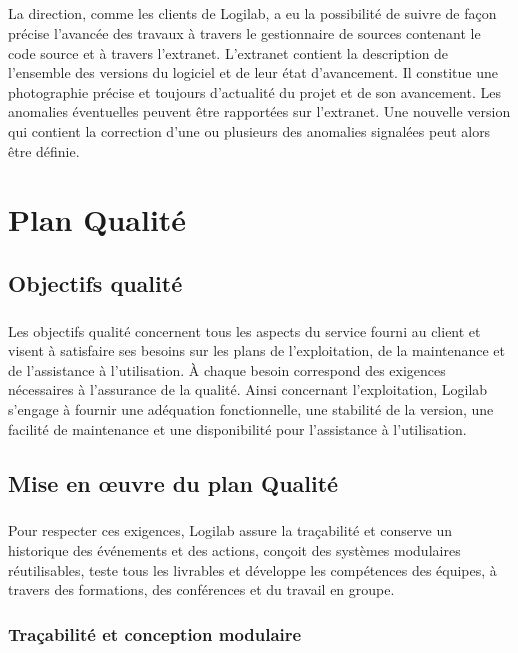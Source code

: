 \documentclass {report}
\begin{document}
\paragraph{}
La direction, comme les clients de Logilab, a eu la possibilité de suivre de façon précise l’avancée des travaux à travers le gestionnaire de sources contenant le code source et à travers l’extranet. L’extranet contient la description de l’ensemble des versions du logiciel et de leur état d’avancement. Il constitue une photographie précise et toujours d’actualité du projet et de son avancement. Les anomalies éventuelles peuvent être rapportées sur l’extranet. Une nouvelle version qui contient la correction d’une ou plusieurs des anomalies signalées peut alors être définie.



\chapter{Plan Qualité}
\section{Objectifs qualité}
\paragraph{}
Les objectifs qualité concernent tous les aspects du service fourni au client et visent à satisfaire ses besoins sur les plans de l’exploitation, de la maintenance et de l’assistance à l’utilisation. À chaque besoin correspond des exigences nécessaires à l’assurance de la qualité. Ainsi concernant l'exploitation, Logilab s'engage à fournir une adéquation fonctionnelle, une stabilité de la version, une facilité de maintenance et une disponibilité pour l'assistance à l'utilisation.
\section{Mise en œuvre du plan Qualité}
\paragraph{}
Pour respecter ces exigences, Logilab assure la traçabilité et conserve un historique des événements et des actions, conçoit des systèmes modulaires réutilisables, teste tous les livrables et développe les compétences des équipes, à travers des formations, des conférences et du travail en groupe.
\subsection{Traçabilité et conception modulaire}
\end{document}
